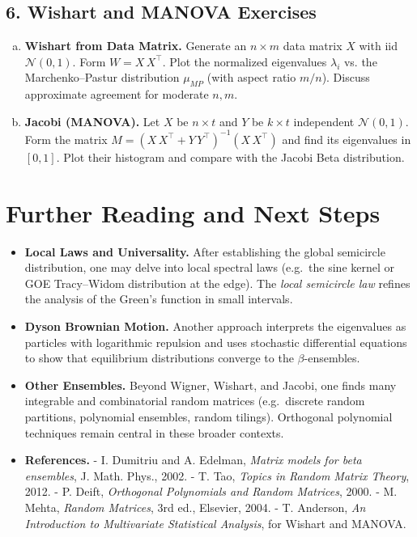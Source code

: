 \documentclass[letterpaper,11pt,oneside,reqno]{article}
\numberwithin{equation}{section}
\theoremstyle{definition}
\begin{document}
\subsection*{6. Wishart and MANOVA Exercises}

\begin{enumerate}[(a)]
\item {\bf Wishart from Data Matrix.} Generate an $n\times m$ data matrix $X$ with iid $\mathcal{N}(0,1)$. Form $W=X\,X^\top$. Plot the normalized eigenvalues $\lambda_i$ vs. the Marchenko–Pastur distribution $\mu_{MP}$ (with aspect ratio $m/n$). Discuss approximate agreement for moderate $n,m$.
\item {\bf Jacobi (MANOVA).} Let $X$ be $n\times t$ and $Y$ be $k\times t$ independent $\mathcal{N}(0,1)$. Form the matrix $M=(X\,X^\top +Y\,Y^\top)^{-1} (X\,X^\top)$ and find its eigenvalues in $[0,1]$. Plot their histogram and compare with the Jacobi Beta distribution.
\end{enumerate}

\section{Further Reading and Next Steps}

\begin{itemize}
\item {\bf Local Laws and Universality.} After establishing the global semicircle distribution, one may delve into local spectral laws (e.g.\ the sine kernel or GOE Tracy–Widom distribution at the edge). The \emph{local semicircle law} refines the analysis of the Green’s function in small intervals.
\item {\bf Dyson Brownian Motion.} Another approach interprets the eigenvalues as particles with logarithmic repulsion and uses stochastic differential equations to show that equilibrium distributions converge to the $\beta$-ensembles.
\item {\bf Other Ensembles.} Beyond Wigner, Wishart, and Jacobi, one finds many integrable and combinatorial random matrices (e.g.\ discrete random partitions, polynomial ensembles, random tilings). Orthogonal polynomial techniques remain central in these broader contexts.
\item {\bf References.}
  - I. Dumitriu and A. Edelman, \emph{Matrix models for beta ensembles}, J. Math. Phys., 2002.
  - T. Tao, \emph{Topics in Random Matrix Theory}, 2012.
  - P. Deift, \emph{Orthogonal Polynomials and Random Matrices}, 2000.
  - M. Mehta, \emph{Random Matrices}, 3rd ed., Elsevier, 2004.
  - T. Anderson, \emph{An Introduction to Multivariate Statistical Analysis}, for Wishart and MANOVA.
\end{itemize}
\end{document}
